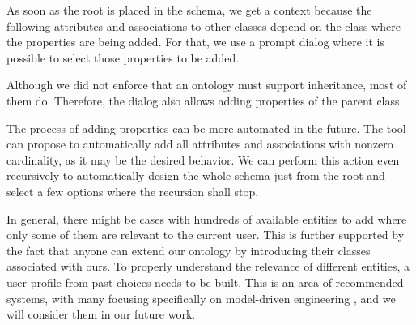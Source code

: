 As soon as the root is placed in the schema, we get a context because the following attributes and associations to other classes depend on the class where the properties are being added. For that, we use a prompt dialog where it is possible to select those properties to be added.

Although we did not enforce that an ontology must support inheritance, most of them do. Therefore, the dialog also allows adding properties of the parent class.

\medskip

The process of adding properties can be more automated in the future. The tool can propose to automatically add all attributes and associations with nonzero cardinality, as it may be the desired behavior. We can perform this action even recursively to automatically design the whole schema just from the root and select a few options where the recursion shall stop.

In general, there might be cases with hundreds of available entities to add where only some of them are relevant to the current user. This is further supported by the fact that anyone can extend our ontology by introducing their classes associated with ours. To properly understand the relevance of different entities, a user profile from past choices needs to be built. This is an area of recommended systems, with many focusing specifically on model-driven engineering \cite{almonte2022recommender}, and we will consider them in our future work.